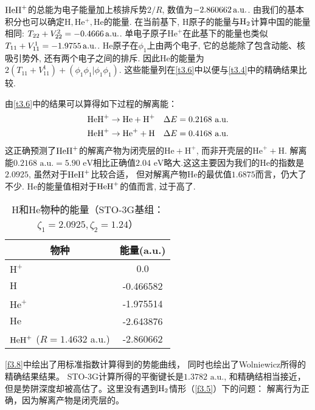 $\mathrm{HeH}^+$的总能为电子能量加上核排斥势$2/R$, 数值为$-2.860662\,\mathrm{a.u.}$. 由我们的基本积分也可以确定$\mathrm{H,He^+,He}$的能量. 在当前基下, $\mathrm{H}$原子的能量与$\mathrm{H}_2$计算中国的能量相同: $T_{22}+V_{22}^2=-0.4666\,\mathrm{a.u.}$. 单电子原子$\mathrm{He}^+$在此基下的能量也类似$T_{11}+V_{11}^1=-1.9755\,\mathrm{a.u.}$. $\mathrm{He}$原子在$\phi_1$上由两个电子, 它的总能除了包含动能、核吸引势外, 还有两个电子之间的排斥. 因此$\mathrm{He}$的能量为$2(T_{11}+V_{11}^1)+(\phi_1\phi_1|\phi_1\phi_1)$. 这些能量列在\ref{t3.6}中以便与\ref{t3.4}中的精确结果比较.

由\ref{t3.6}中的结果可以算得如下过程的解离能：
\begin{align}
\mathrm{HeH}^+ & \to \text{He} + \text{H}^+ \quad \Delta E = 0.2168\,\, \text{a.u.}\\
\mathrm{HeH}^+ & \to \text{He}^+ + \text{H} \quad \Delta E = 0.4168\,\, \text{a.u.}
\end{align}
这正确预测了$\mathrm{HeH}^+$的解离产物为闭壳层的$\text{He}+\text{H}^+$, 而非开壳层的$\text{He}^++\text{H}$. 解离能$0.2168\,\,\text{a.u.}=5.90\,\,\text{eV}$相比正确值$2.04\,\,\text{eV}$略大.这这主要因为我们的$\text{He}$的指数是$2.0925$, 虽然对于$\mathrm{HeH}^+$比较合适， 但对解离产物$\text{He}$的最优值$1.6875$而言，仍大了不少. $\text{He}$的能量值相对于$\mathrm{HeH}^+$的值而言, 过于高了.
\begin{table}[h]
	\centering\caption{$\text{H}$和$\text{He}$物种的能量（STO-3G基组： $\zeta_1=2.0925,\zeta_2=1.24$）}
	\begin{tabular}{lc}
		\hline
		\multicolumn{1}{c}{物种} & 能量(a.u.)\\\hline
		$\text{H}^+$             & 0.0\\
		$\text{H}$               & -0.466582\\
		$\text{He}^+$            & -1.975514\\
		$\text{He}$              & -2.643876\\
		$\mathrm{HeH}^+$ ($R=1.4632$ a.u.) & -2.860662\\
		\hline
	\end{tabular}
\end{table}
\ref{f3.8}中绘出了用标准指数计算得到的势能曲线， 同时也绘出了Wolniewicz所得的精确结果结果。 STO-3G计算所得的平衡键长是$1.3782\,\,\text{a.u.}$, 和精确结相当接近，但是势阱深度却被高估了。这里没有遇到$\mathrm{H}_2$情形（\ref{f3.5}）下的问题： 解离行为正确，因为解离产物是闭壳层的。
